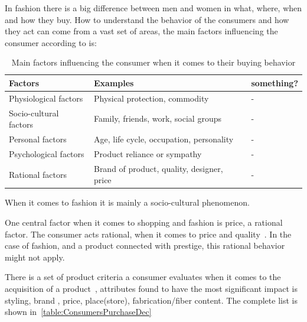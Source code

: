 
In fashion there is a big difference between men and women in what, where, when
and how they buy.  How to understand the behavior of the consumers and how they
act can come from a vast set of areas, the main factors influencing the
consumer according to \cite{kotler2009marketing} is:

\begin{table}[H]
    \centering
    \begin{tabular}{l|l|l}
      \textbf{Factors}        & \textbf{Examples} & \textbf{something?} \\ \hline
      Physiological factors   & Physical protection, commodity & - \\ \hline
      Socio-cultural factors  & Family, friends, work, social groups & - \\ \hline
      Personal factors        & Age, life cycle, occupation, personality & - \\ \hline
      Psychological factors   & Product reliance or sympathy & - \\ \hline %
      Rational factors        & Brand of product, quality, designer, price & - \\
    \end{tabular}
    \caption[Fashion Factors]{Main factors influencing the consumer when it comes to their buying behavior}
    \label{table:FashionFactors}
\end{table}
When it comes to fashion it is mainly a socio-cultural phenomenon.

One central factor when it comes to shopping and fashion is price, a rational factor.
The consumer acts rational, when it comes to price and quality~\cite{Hanf1994}.
In the case of fashion, and a product connected with prestige, this rational
behavior might not apply.

There is a set of product criteria a consumer evaluates when it comes to the
acquisition of a product~\cite{dutton2006}, attributes found to have the most
significant impact is styling, brand , price, place(store), fabrication/fiber
content.  The complete list is shown in~\ref{table:ConsumersPurchaseDec}

